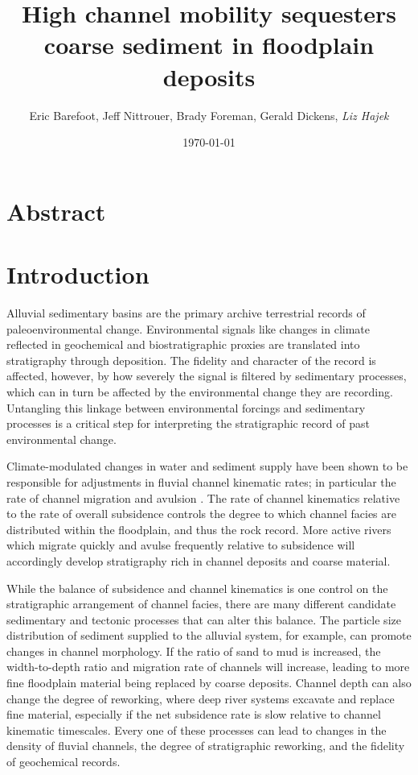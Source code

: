 \documentclass[draft]{compact_proposal}
\title{High channel mobility sequesters coarse sediment in floodplain deposits}
\author{Eric Barefoot, Jeff Nittrouer, Brady Foreman, Gerald Dickens, \textit{Liz Hajek}}
\date{\today}
\begin{document}
\maketitle


\section{Abstract}

\section{Introduction}

Alluvial sedimentary basins are the primary archive  terrestrial records of paleoenvironmental change.
Environmental signals like changes in climate reflected in geochemical and biostratigraphic proxies are translated into stratigraphy through  deposition.
The fidelity and character of the record is affected, however, by how severely the signal is filtered by sedimentary processes, which can in turn be affected by the environmental change they are recording.
Untangling this linkage between environmental forcings and sedimentary processes is a critical step for interpreting the stratigraphic record of past environmental change.

Climate-modulated changes in water and sediment supply have been shown to be responsible for adjustments in fluvial channel kinematic rates; in particular the rate of channel migration and avulsion .
The rate of channel kinematics relative to the rate of overall subsidence controls the degree to which channel facies are distributed within the floodplain, and thus the rock record.
More active rivers which migrate quickly and avulse frequently relative to subsidence will accordingly develop stratigraphy rich in channel deposits and coarse material.

While the balance of subsidence and channel kinematics is one control on the stratigraphic arrangement of channel facies, there are many different candidate sedimentary and tectonic processes that can alter this balance.
The particle size distribution of sediment supplied to the alluvial system, for example, can promote changes in channel morphology.
If the ratio of sand to mud is increased, the width-to-depth ratio and migration rate of channels will increase, leading to more fine floodplain material being replaced by coarse deposits.
Channel depth can also change the degree of reworking, where deep river systems excavate and replace fine material, especially if the net subsidence rate is slow relative to channel kinematic timescales.
Every one of these processes can lead to changes in the density of fluvial channels, the degree of stratigraphic reworking, and the fidelity of geochemical records.
\end{document}
